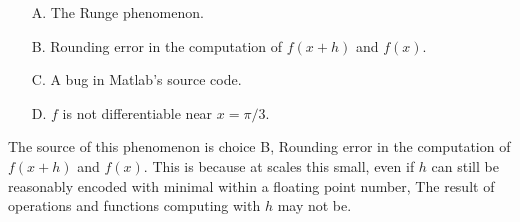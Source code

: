 \documentclass{article}
\begin{document}
\begin{enumerate}
\begin{enumerate}
        \item[A.] The Runge phenomenon.
        \item[B.] Rounding error in the computation of $f(x + h)$ and $f(x)$.
        \item[C.] A bug in Matlab’s source code.
        \item[D.] $f$ is not differentiable near $x = \pi/3$.
    \end{enumerate}
    \newline
    \newline
    The source of this phenomenon is choice B, Rounding error in the computation of $f(x + h)$ and $f(x)$. This is because at scales this small, even if $h$ can still be reasonably encoded with minimal within a floating point number, The result of operations and functions computing with $h$ may not be.   
\end{enumerate}
\end{document}

